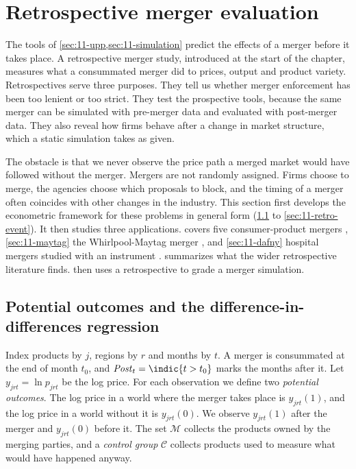 \section{Retrospective merger evaluation}\label{sec:11-retro}

The tools of \cref{sec:11-upp,sec:11-simulation} predict the effects of a merger before it takes place. A
retrospective merger study, introduced at the start of the chapter, measures what a consummated merger did to
prices, output and product variety. Retrospectives serve three purposes. They tell us whether merger enforcement has been too
lenient or too strict. They test the prospective tools, because the same merger can be simulated with
pre-merger data and evaluated with post-merger data. They also reveal how firms behave after a change in market
structure, which a static simulation takes as given.

The obstacle is that we never observe the price path a merged market would have followed without the merger.
Mergers are not randomly assigned. Firms choose to merge, the agencies choose which proposals to block, and the
timing of a merger often coincides with other changes in the industry. This section first develops the
econometric framework for these problems in general form (\cref{sec:11-retro-problem} to
\cref{sec:11-retro-event}). It then studies three applications.  covers five consumer-product
mergers \citep{AshenfelterHosken2010}, \cref{sec:11-maytag} the Whirlpool-Maytag merger
\citep{AshenfelterHoskenWeinberg2013}, and \cref{sec:11-dafny} hospital mergers studied with an instrument
\citep{Dafny2009}.  summarizes what the wider retrospective literature finds. 
then uses a retrospective to grade a merger simulation.

\subsection{Potential outcomes and the difference-in-differences regression}\label{sec:11-retro-problem}

Index products by $j$, regions by $r$ and months by $t$. A merger is consummated at the end of month $t_0$, and
$\mathit{Post}_t=\indic\{t>t_0\}$ marks the months after it. Let $y_{jrt}=\ln p_{jrt}$ be the log price. For
each observation we define two \emph{potential outcomes}. The log price in a world where the merger takes place is
$y_{jrt}(1)$, and the log price in a world without it is $y_{jrt}(0)$. We observe $y_{jrt}(1)$ after the
merger and $y_{jrt}(0)$ before it. The set $\mathcal{M}$ collects the products owned by the merging parties, and
a \emph{control group} $\mathcal{C}$ collects products used to measure what would have happened anyway.

